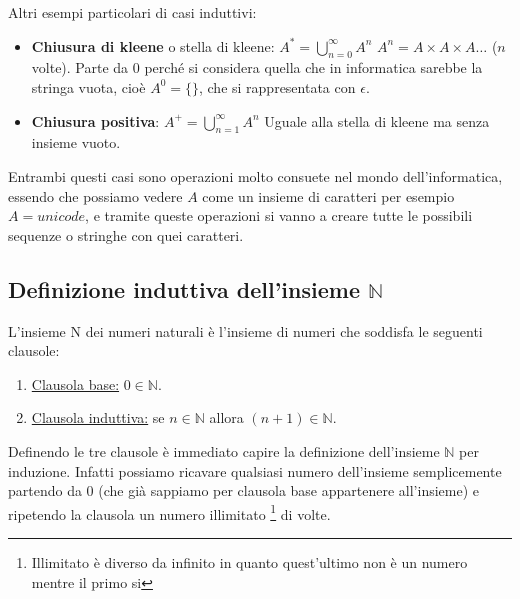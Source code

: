 \begin{example}
    Altri esempi particolari di casi induttivi:
    \begin{itemize}
        \item \textbf{Chiusura di kleene} o stella di kleene: $A^{*} = \bigcup\limits_{n=0}^{\infty} A^n$ \hspace{.3cm} $A^n = A \times A \times A \ldots$ ($n$ volte). Parte da $0$ perché si considera quella che in informatica sarebbe la stringa vuota, cioè $A^0 = \{\}$, che si rappresentata con $\epsilon$.
        \item \textbf{Chiusura positiva}: $A^{+} = \bigcup\limits_{n=1}^{\infty} A^n$ \hspace{.3cm} Uguale alla stella di kleene ma senza insieme vuoto.
    \end{itemize}
    Entrambi questi casi sono operazioni molto consuete nel mondo dell'informatica, essendo che possiamo vedere $A$ come un insieme di caratteri per esempio $A = unicode$, e tramite queste operazioni si vanno a creare tutte le possibili sequenze o stringhe con quei caratteri.
\end{example}

\subsection{Definizione induttiva dell'insieme $\mathbb{N}$}
\begin{definition}\label{definizioni-induttiva-insieme-N}
    L’insieme N dei numeri naturali è l’insieme di numeri che soddisfa le seguenti clausole:
    \begin{enumerate}
        \item \underline{Clausola base:} $0 \in \mathbb{N}$.
        \item \underline{Clausola induttiva:} se $n \in \mathbb{N}$ allora $(n + 1) \in \mathbb{N}$.
    \end{enumerate}
\end{definition}
Definendo le tre clausole è immediato capire la definizione dell'insieme $\mathbb{N}$ per induzione. Infatti possiamo ricavare qualsiasi numero dell'insieme semplicemente partendo da 0 (che già sappiamo per clausola base appartenere all'insieme) e ripetendo la clausola un numero illimitato \footnote{Illimitato è diverso da infinito in quanto quest'ultimo non è un numero mentre il primo si} di volte. 


